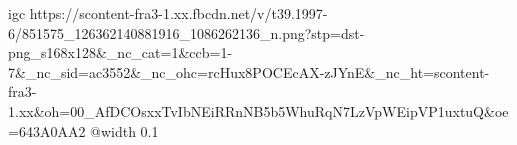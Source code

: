  
 
 
 
 

\qqSecCmt


\ifcmt
  igc https://scontent-fra3-1.xx.fbcdn.net/v/t39.1997-6/851575_126362140881916_1086262136_n.png?stp=dst-png_s168x128&_nc_cat=1&ccb=1-7&_nc_sid=ac3552&_nc_ohc=rcHux8POCEcAX-zJYnE&_nc_ht=scontent-fra3-1.xx&oh=00_AfDCOsxxTvIbNEiRRnNB5b5WhuRqN7LzVpWEipVP1uxtuQ&oe=643A0AA2
	@width 0.1
\fi

